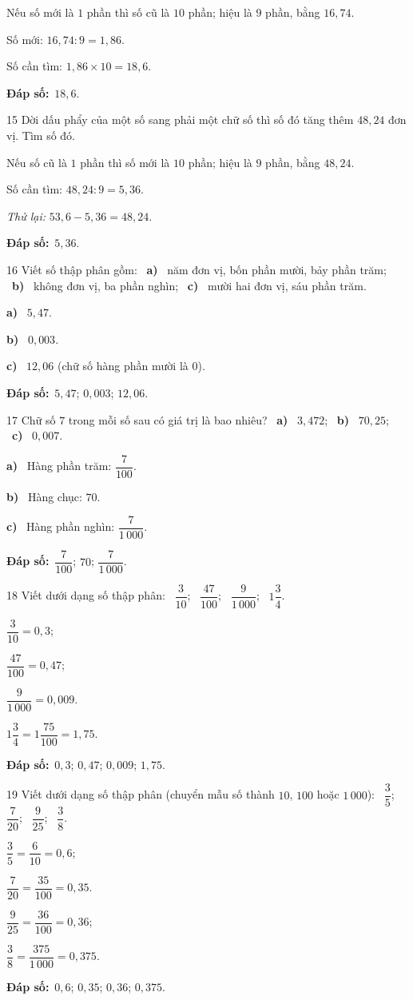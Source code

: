\documentclass[11pt]{article}
\newif\ifsol \solfalse
\providecommand{\AnsWord}{Đáp số}
\newcommand{\dapso}[1]{\par\textbf{\AnsWord:}\ #1}
\newcommand{\probsol}[1]{%
  \begin{lrbox}{\solmeasure}\begin{minipage}{\dimexpr\linewidth-24pt\relax}#1\end{minipage}\end{lrbox}%
  \ifsol
    \begin{solbox}#1\end{solbox}%
  \else
    \setlength{\solht}{\dimexpr\ht\solmeasure+\dp\solmeasure+0.85cm\relax}%
    \ifdim\solht<1.35cm\setlength{\solht}{1.35cm}\fi
    \begin{tcolorbox}[colback=white,colframe=Line,boxrule=0.8pt,arc=5pt,
      left=8pt,right=8pt,top=4pt,bottom=4pt,height=\solht]{\footnotesize\color{Slate}\itshape\WorkWord}\end{tcolorbox}%
  \fi}
\newcommand{\pa}[1]{\textbf{#1)}\ }
\newcommand{\gap}{\vspace{0.3cm}}
\def\WorkWord{Bài làm:}
\def\AnsWord{Đáp số}
\begin{document}
\probsol{
Nếu số mới là $1$ phần thì số cũ là $10$ phần; hiệu là $9$ phần, bằng $16{,}74$.\par
Số mới: $16{,}74:9=1{,}86$.\par Số cần tìm: $1{,}86\times10=18{,}6$.
\dapso{$18{,}6$.}}
\gap
\begin{probbox}{15}{\relax}
Dời dấu phẩy của một số sang phải một chữ số thì số đó tăng thêm $48{,}24$ đơn vị. Tìm số đó.
\end{probbox}
\probsol{
Nếu số cũ là $1$ phần thì số mới là $10$ phần; hiệu là $9$ phần, bằng $48{,}24$.\par
Số cần tìm: $48{,}24:9=5{,}36$.\par \emph{Thử lại:} $53{,}6-5{,}36=48{,}24$.
\dapso{$5{,}36$.}}
\gap
\begin{probbox}{16}{\relax}
Viết số thập phân gồm: \ \pa{a} năm đơn vị, bốn phần mười, bảy phần trăm; \ \pa{b} không đơn vị, ba phần nghìn; \ \pa{c} mười hai đơn vị, sáu phần trăm.
\end{probbox}
\probsol{
\pa{a} $5{,}47$.\par \pa{b} $0{,}003$.\par \pa{c} $12{,}06$ (chữ số hàng phần mười là $0$).
\dapso{$5{,}47$; $0{,}003$; $12{,}06$.}}
\gap
\begin{probbox}{17}{\relax}
Chữ số $7$ trong mỗi số sau có giá trị là bao nhiêu? \ \pa{a} $3{,}472$; \ \pa{b} $70{,}25$; \ \pa{c} $0{,}007$.
\end{probbox}
\probsol{
\pa{a} Hàng phần trăm: $\dfrac7{100}$.\par \pa{b} Hàng chục: $70$.\par \pa{c} Hàng phần nghìn: $\dfrac7{1\,000}$.
\dapso{$\dfrac7{100}$; $70$; $\dfrac7{1\,000}$.}}
\gap
\begin{probbox}{18}{\relax}
Viết dưới dạng số thập phân: \ $\dfrac3{10}$; \ $\dfrac{47}{100}$; \ $\dfrac9{1\,000}$; \ $1\dfrac34$.
\end{probbox}
\probsol{
$\dfrac3{10}=0{,}3$;\par $\dfrac{47}{100}=0{,}47$;\par $\dfrac9{1\,000}=0{,}009$.\par $1\dfrac34=1\dfrac{75}{100}=1{,}75$.
\dapso{$0{,}3$; $0{,}47$; $0{,}009$; $1{,}75$.}}
\gap
\begin{probbox}{19}{\relax}
Viết dưới dạng số thập phân (chuyển mẫu số thành $10$, $100$ hoặc $1\,000$): \ $\dfrac35$; \ $\dfrac7{20}$; \ $\dfrac9{25}$; \ $\dfrac38$.
\end{probbox}
\probsol{
$\dfrac35=\dfrac6{10}=0{,}6$;\par $\dfrac7{20}=\dfrac{35}{100}=0{,}35$.\par $\dfrac9{25}=\dfrac{36}{100}=0{,}36$;\par $\dfrac38=\dfrac{375}{1\,000}=0{,}375$.
\dapso{$0{,}6$; $0{,}35$; $0{,}36$; $0{,}375$.}}
\end{document}
